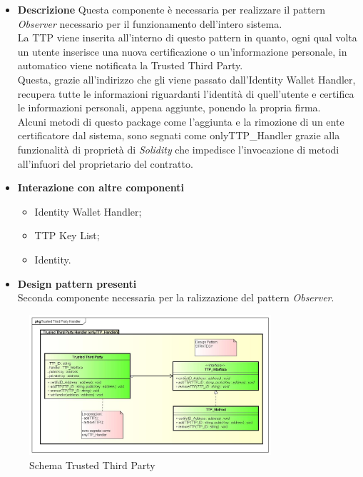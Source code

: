 \begin{itemize}
	\item \textbf{Descrizione}
	Questa componente è necessaria per realizzare il pattern \textit{Observer} necessario per il funzionamento dell'intero sistema.\\
	La \gls{TTP} viene inserita all'interno di questo pattern in quanto, ogni qual volta un utente inserisce una nuova certificazione o un'informazione personale, in automatico viene notificata la Trusted Third Party.\\
	Questa, grazie all'indirizzo che gli viene passato dall'Identity Wallet Handler, recupera tutte le informazioni riguardanti l'identità di quell'utente e certifica le informazioni personali, appena aggiunte, ponendo la propria firma.\\
	Alcuni metodi di questo package come l'aggiunta e la rimozione di un ente certificatore dal sistema, sono segnati come onlyTTP\_Handler grazie alla funzionalità di proprietà di \textit{Solidity} che impedisce l'invocazione di metodi all'infuori del proprietario del contratto.
	\item \textbf{Interazione con altre componenti}
	\begin{itemize}
		\item Identity Wallet Handler;
		\item TTP Key List;
		\item Identity.
	\end{itemize}
	\item \textbf{Design pattern presenti}\\
	Seconda componente necessaria per la ralizzazione del pattern \textit{Observer}.
\end{itemize}
\begin{figure}[!h]
	\centering
	\includegraphics[width=0.8\textwidth]{immagini/trustedThirdPartyScheme}
	\caption{Schema Trusted Third Party}
\end{figure}
